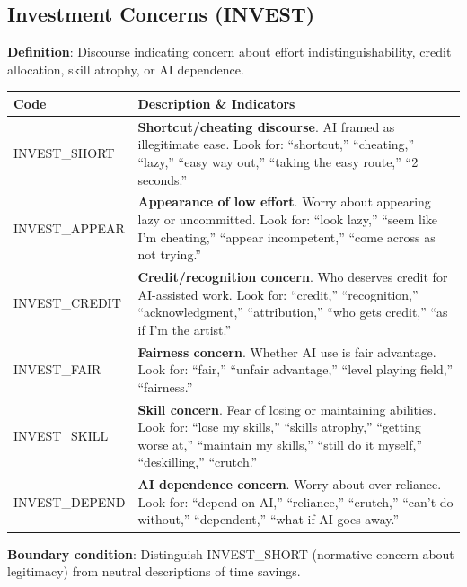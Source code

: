 \documentclass[11pt]{article}
\begin{document}
\newpage
\subsection{Investment Concerns (INVEST)}

\begin{tcolorbox}[colback=investcolor!10, colframe=investcolor!80, title=\textbf{INVEST: Investment and Effort Concern Codes}, fonttitle=\bfseries\sffamily]

\textbf{Definition}: Discourse indicating concern about effort indistinguishability, credit allocation, skill atrophy, or AI dependence.

\vspace{0.5em}
\begin{tabular}{@{}p{3.5cm}p{10cm}@{}}
\toprule
\textbf{Code} & \textbf{Description \& Indicators} \\
\midrule
INVEST\_SHORT & \textbf{Shortcut/cheating discourse}. AI framed as illegitimate ease. Look for: ``shortcut,'' ``cheating,'' ``lazy,'' ``easy way out,'' ``taking the easy route,'' ``2 seconds.'' \\[0.5em]
INVEST\_APPEAR & \textbf{Appearance of low effort}. Worry about appearing lazy or uncommitted. Look for: ``look lazy,'' ``seem like I'm cheating,'' ``appear incompetent,'' ``come across as not trying.'' \\[0.5em]
INVEST\_CREDIT & \textbf{Credit/recognition concern}. Who deserves credit for AI-assisted work. Look for: ``credit,'' ``recognition,'' ``acknowledgment,'' ``attribution,'' ``who gets credit,'' ``as if I'm the artist.'' \\[0.5em]
INVEST\_FAIR & \textbf{Fairness concern}. Whether AI use is fair advantage. Look for: ``fair,'' ``unfair advantage,'' ``level playing field,'' ``fairness.'' \\[0.5em]
INVEST\_SKILL & \textbf{Skill concern}. Fear of losing or maintaining abilities. Look for: ``lose my skills,'' ``skills atrophy,'' ``getting worse at,'' ``maintain my skills,'' ``still do it myself,'' ``deskilling,'' ``crutch.'' \\[0.5em]
INVEST\_DEPEND & \textbf{AI dependence concern}. Worry about over-reliance. Look for: ``depend on AI,'' ``reliance,'' ``crutch,'' ``can't do without,'' ``dependent,'' ``what if AI goes away.'' \\
\bottomrule
\end{tabular}

\vspace{0.5em}
\textbf{Boundary condition}: Distinguish INVEST\_SHORT (normative concern about legitimacy) from neutral descriptions of time savings.
\end{tcolorbox}
\end{document}
